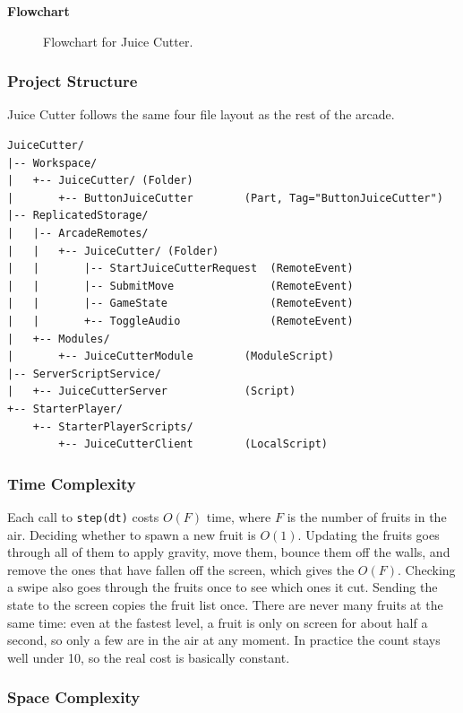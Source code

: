 \documentclass[12pt,letterpaper]{article}
\begin{document}
\textbf{Flowchart}
\begin{figure}[H]
  \centering
  
  \caption{Flowchart for Juice Cutter.}
  \label{fig:juicecutter_flow}
\end{figure}

\subsubsection{Project Structure}

Juice Cutter follows the same four file layout as the rest of the arcade.

\begin{lstlisting}
JuiceCutter/
|-- Workspace/
|   +-- JuiceCutter/ (Folder)
|       +-- ButtonJuiceCutter        (Part, Tag="ButtonJuiceCutter")
|-- ReplicatedStorage/
|   |-- ArcadeRemotes/
|   |   +-- JuiceCutter/ (Folder)
|   |       |-- StartJuiceCutterRequest  (RemoteEvent)
|   |       |-- SubmitMove               (RemoteEvent)
|   |       |-- GameState                (RemoteEvent)
|   |       +-- ToggleAudio              (RemoteEvent)
|   +-- Modules/
|       +-- JuiceCutterModule        (ModuleScript)
|-- ServerScriptService/
|   +-- JuiceCutterServer            (Script)
+-- StarterPlayer/
    +-- StarterPlayerScripts/
        +-- JuiceCutterClient        (LocalScript)
\end{lstlisting}

\subsubsection{Time Complexity}

Each call to \texttt{step(dt)} costs $O(F)$ time, where $F$ is the number of fruits in the air. Deciding whether to spawn a new fruit is $O(1)$. Updating the fruits goes through all of them to apply gravity, move them, bounce them off the walls, and remove the ones that have fallen off the screen, which gives the $O(F)$. Checking a swipe also goes through the fruits once to see which ones it cut. Sending the state to the screen copies the fruit list once. There are never many fruits at the same time: even at the fastest level, a fruit is only on screen for about half a second, so only a few are in the air at any moment. In practice the count stays well under 10, so the real cost is basically constant.

\subsubsection{Space Complexity}
\end{document}
